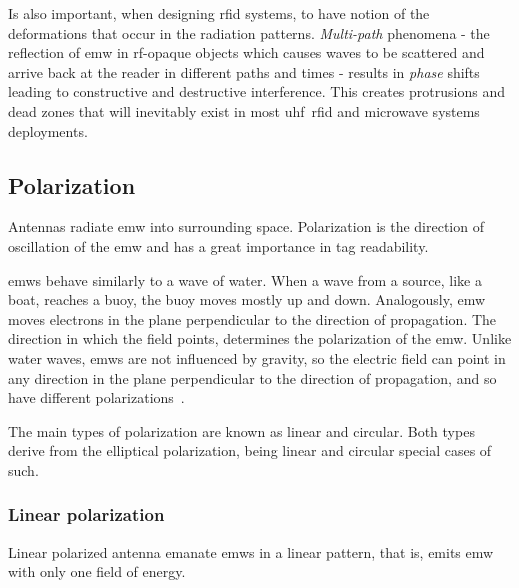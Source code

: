 Is also important, when designing \ac{rfid} systems, to have notion of the deformations that occur in the radiation patterns.
\emph{Multi-path} phenomena - the reflection of \ac{emw} in \ac{rf}-opaque objects which causes waves to be scattered and arrive back at the reader in different paths and times - results in \emph{phase} shifts leading to constructive and destructive interference.
This creates protrusions and dead zones that will inevitably exist in most \acs{uhf}~\acs{rfid} and microwave systems deployments. 



\subsection{Polarization}

Antennas radiate \ac{emw} into surrounding space.
Polarization is the direction of oscillation of the \ac{emw} and has a great importance in tag readability.

\acp{emw} behave similarly to a wave of water. When a wave from a source, like a boat, reaches a buoy, the buoy moves mostly up and down.
Analogously, \ac{emw} moves electrons in the plane perpendicular to the direction of propagation. The direction in which the field points, determines the polarization of the \ac{emw}.
Unlike water waves, \acp{emw} are not influenced by gravity, so the electric field can point in any direction in the plane perpendicular to the direction of propagation, and so have different polarizations~\cite{dobkinRFRFIDSecond2012}.

The main types of polarization are known as linear and circular. Both types derive from the elliptical polarization, being linear and circular special cases of such.

\subsubsection{Linear polarization}

Linear polarized antenna emanate \acp{emw} in a linear pattern, that is, emits \ac{emw} with only one field of energy.

